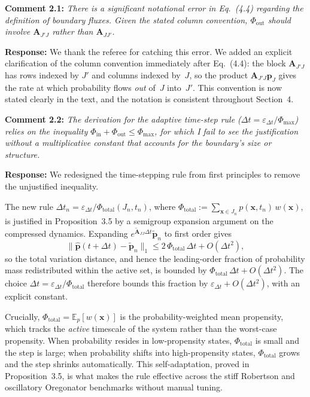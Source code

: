 \documentclass[11pt]{article}
\begin{document}
\noindent\textbf{Comment 2.1:} \textit{There is a significant notational error
in Eq.\ (4.4) regarding the definition of boundary fluxes. Given the stated
column convention, $\Phi_{\mathrm{out}}$ should involve $\mathbf{A}_{J'J}$
rather than $\mathbf{A}_{JJ'}$.}

\textbf{Response:} We thank the referee for catching this error.  We added an
explicit clarification of the column convention immediately after Eq.~(4.4):
the block $\mathbf{A}_{J'J}$ has rows indexed by $J'$ and columns indexed
by~$J$, so the product $\mathbf{A}_{J'J}\boldsymbol{p}_J$ gives the rate
at which probability flows \emph{out} of~$J$ into~$J'$. This convention is now
stated clearly in the text, and the notation is consistent throughout Section~4.

\medskip

\noindent\textbf{Comment 2.2:} \textit{The derivation for the adaptive
time-step rule ($\Delta t = \varepsilon_{\Delta t}/\Phi_{\max}$) relies on the
inequality $\Phi_{\mathrm{in}} + \Phi_{\mathrm{out}} \leq \Phi_{\max}$, for
which I fail to see the justification without a multiplicative constant that
accounts for the boundary's size or structure.}

\textbf{Response:} We redesigned the time-stepping
rule from first principles to remove the unjustified inequality.

The new rule $\Delta t_n = \varepsilon_{\Delta t}/\Phi_{\mathrm{total}}(J_n,t_n)$, where $\Phi_{\mathrm{total}} := \sum_{\boldsymbol{x}\in J_n}p(\boldsymbol{x},t_n)\,w(\boldsymbol{x})$, is justified in Proposition~3.5 by a semigroup expansion argument on the compressed dynamics. Expanding $e^{\widetilde{\mathbf{A}}_{JJ}\Delta t}\widetilde{\boldsymbol{p}}_n$ to first order gives
\[
\|\widehat{\boldsymbol{p}}(t+\Delta t)-\widetilde{\boldsymbol{p}}_n\|_1 \leq 2\,\Phi_{\mathrm{total}}\,\Delta t + O(\Delta t^2),
\]
so the total variation distance, and hence the leading-order fraction of probability mass redistributed within the active set, is bounded by $\Phi_{\mathrm{total}}\,\Delta t + O(\Delta t^2)$. The choice $\Delta t = \varepsilon_{\Delta t}/\Phi_{\mathrm{total}}$ therefore bounds this fraction by $\varepsilon_{\Delta t} + O(\Delta t^2)$, with an explicit constant.

Crucially, $\Phi_{\mathrm{total}} = \mathbb{E}_p[w(\boldsymbol{x})]$ is the probability-weighted mean propensity, which tracks the \emph{active} timescale of the system rather than the worst-case propensity. When probability resides in low-propensity states, $\Phi_{\mathrm{total}}$ is small and the step is large; when probability shifts into high-propensity states, $\Phi_{\mathrm{total}}$ grows and the step shrinks automatically. This self-adaptation, proved in Proposition~3.5, is what makes the rule effective across the stiff Robertson and oscillatory Oregonator benchmarks without manual tuning.
\end{document}
